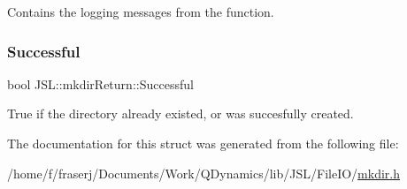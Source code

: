 Contains the logging messages from the function. 

\mbox{\label{structJSL_1_1mkdirReturn_a76abe5af61a20e13756f833b79782b7f}} 
\subsubsection{\texorpdfstring{Successful}{Successful}}
{\footnotesize\ttfamily bool J\+S\+L\+::mkdir\+Return\+::\+Successful}



True if the directory already existed, or was succesfully created. 



The documentation for this struct was generated from the following file\+:\begin{DoxyCompactItemize}
\item 
/home/f/fraserj/\+Documents/\+Work/\+Q\+Dynamics/lib/\+J\+S\+L/\+File\+I\+O/\hyperlink{mkdir_8h}{mkdir.\+h}\end{DoxyCompactItemize}
